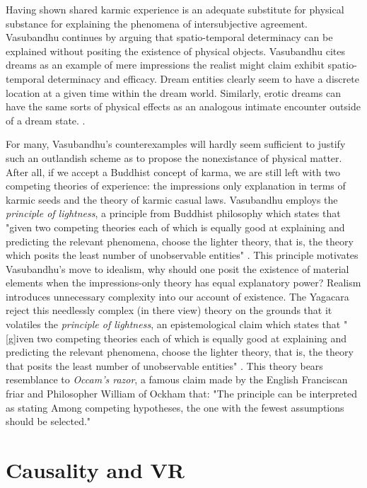 Having shown shared karmic experience is an adequate substitute for physical substance for explaining the phenomena of intersubjective agreement.  Vasubandhu continues by arguing that spatio-temporal determinacy can be explained without positing the existence of physical objects. Vasubandhu cites dreams as an example of mere impressions the realist might claim exhibit spatio-temporal determinacy and efficacy. Dream entities clearly seem to have a discrete location at a given time within the dream world. Similarly, erotic dreams can have the same sorts of physical effects as an analogous intimate encounter outside of a dream state. \cite{siderits2007buddhism}.
\newline

For many, Vasubandhu's counterexamples will hardly seem sufficient to justify such an outlandish scheme as to propose the nonexistance of physical matter. After all, if we accept a Buddhist concept of karma, we are still left with two competing theories of experience: the impressions only explanation in terms of karmic seeds and the theory of karmic casual laws. \cite{siderits2007buddhism} Vasubandhu employs the \textit{principle of lightness}, a principle from Buddhist philosophy which states that "given two competing theories each of which is equally good at explaining and predicting the relevant phenomena, choose the lighter theory, that is, the theory which posits the least number of unobservable entities" \cite{siderits2007buddhism}. This principle motivates Vasubandhu's move to idealism, why should one posit the existence of material elements when the impressions-only theory has equal explanatory power? Realism introduces unnecessary complexity into our account of existence. The Yagacara reject this needlessly complex (in there view) theory on the grounds that it volatiles the \textit{principle of lightness}, an epistemological claim which states that "[g]iven two competing theories each of which is equally good at explaining and predicting the relevant phenomena, choose the lighter theory, that is, the theory that posits the least number of unobservable entities" \cite{siderits2007buddhism}. This theory bears resemblance to \textit{Occam's razor}, a famous claim made by the English Franciscan friar and Philosopher William of Ockham that:
"The principle can be interpreted as stating Among competing hypotheses, the one with the fewest assumptions should be selected."


\section{Causality and VR}


